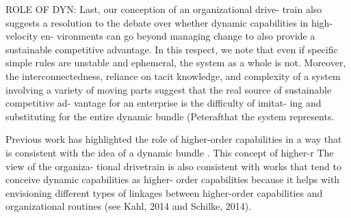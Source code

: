 ROLE OF DYN:
Last, our conception of an organizational drive-
train also suggests a resolution to the debate over whether dynamic capabilities in high-velocity en- vironments can go beyond managing change to also provide a sustainable competitive advantage. In this respect, we note that even if specific simple rules are unstable and ephemeral, the system as a whole is not. Moreover, the interconnectedness, reliance on tacit knowledge, and complexity of a system involving a variety of moving parts suggest that the real source of sustainable competitive ad- vantage for an enterprise is the difficulty of imitat- ing and substituting for the entire dynamic bundle (Peterafthat the system represents.


Previous work has highlighted the role of higher-order capabilities in a way that is
consistent with the idea of a dynamic bundle \citep{Schilke2014a}. This concept of higher-r
The view of the organiza- tional drivetrain is also consistent with works that tend to conceive dynamic capabilities as higher- order capabilities because it helps with envisioning different types of linkages between higher-order capabilities and organizational routines (see Kahl, 2014 and Schilke, 2014).
